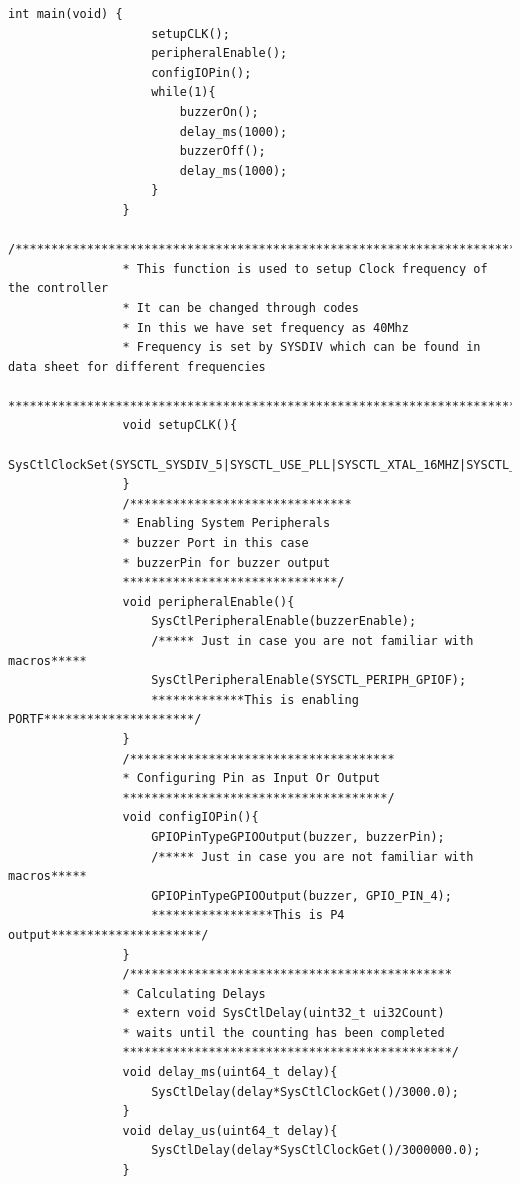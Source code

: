 \documentclass[a4paper,12pt,oneside]{article}
\begin{document}
\begin{lstlisting}[style=CStyle]
				int main(void) {
					setupCLK();
					peripheralEnable();
					configIOPin();
					while(1){
						buzzerOn();
						delay_ms(1000);
						buzzerOff();
						delay_ms(1000);
					}
				}
				/***************************************************************************************
				* This function is used to setup Clock frequency of the controller
				* It can be changed through codes
				* In this we have set frequency as 40Mhz
				* Frequency is set by SYSDIV which can be found in data sheet for different frequencies
				***************************************************************************************/
				void setupCLK(){
					SysCtlClockSet(SYSCTL_SYSDIV_5|SYSCTL_USE_PLL|SYSCTL_XTAL_16MHZ|SYSCTL_OSC_MAIN);
				}
				/*******************************
				* Enabling System Peripherals
				* buzzer Port in this case
				* buzzerPin for buzzer output
				******************************/
				void peripheralEnable(){
					SysCtlPeripheralEnable(buzzerEnable);
					/***** Just in case you are not familiar with macros*****
					SysCtlPeripheralEnable(SYSCTL_PERIPH_GPIOF);
					*************This is enabling PORTF*********************/
				}
				/*************************************
				* Configuring Pin as Input Or Output
				*************************************/
				void configIOPin(){
					GPIOPinTypeGPIOOutput(buzzer, buzzerPin);
					/***** Just in case you are not familiar with macros*****
					GPIOPinTypeGPIOOutput(buzzer, GPIO_PIN_4);
					*****************This is P4 output*********************/
				}
				/*********************************************
				* Calculating Delays
				* extern void SysCtlDelay(uint32_t ui32Count)
				* waits until the counting has been completed
				**********************************************/
				void delay_ms(uint64_t delay){
					SysCtlDelay(delay*SysCtlClockGet()/3000.0);
				}
				void delay_us(uint64_t delay){
					SysCtlDelay(delay*SysCtlClockGet()/3000000.0);
				}
			\end{lstlisting}
			
\end{document}
